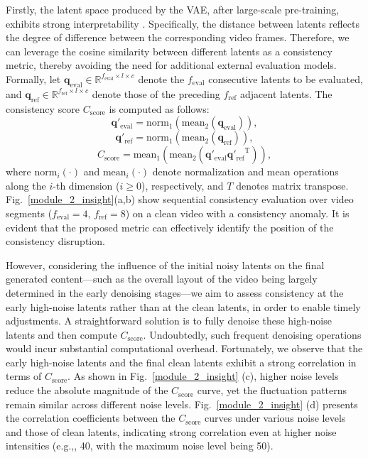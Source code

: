 \documentclass{llmxive}
\providecommand{\eg}{e.g.,\xspace}
\begin{document}
Firstly, the latent space produced by the VAE, after large-scale pre-training, exhibits strong interpretability \cite{kingma2013auto}. Specifically, the distance between latents reflects the degree of difference between the corresponding video frames. Therefore, we can leverage the cosine similarity between different latents as a consistency metric, thereby avoiding the need for additional external evaluation models. 
Formally, let $\mathbf{q}_\mathrm{eval} \in \mathbb{R}^{f_\mathrm{eval} \times l \times c}$ denote the $f_\mathrm{eval}$ consecutive latents to be evaluated, and $\mathbf{q}_\mathrm{ref} \in \mathbb{R}^{f_\mathrm{ref} \times l \times c}$ denote those of the preceding $f_\mathrm{ref}$ adjacent latents. The consistency score $C_\mathrm{score}$ is computed as follows:
\begin{equation}
\mathbf{q}'_\mathrm{eval} = \mathrm{norm}_1\left( \mathrm{mean}_2(\mathbf{q}_\mathrm{eval}) \right),
\label{eq:sim_1}
\end{equation}
\begin{equation}
\mathbf{q}'_\mathrm{ref} = \mathrm{norm}_1\left( \mathrm{mean}_2(\mathbf{q}_\mathrm{ref}) \right),
\label{eq:sim_1_1}
\end{equation}
\begin{equation}
C_\mathrm{score} = \mathrm{mean}_1\left( \mathrm{mean}_2\left( \mathbf{q}'_\mathrm{eval} {\mathbf{q}'_\mathrm{ref}}^\mathrm{T}\right) \right),
\label{eq:sim_2}
\end{equation}
where $\mathrm{norm}_i(\cdot)$ and $\mathrm{mean}_i(\cdot)$ denote normalization and mean operations along the $i$-th dimension ($i \geq 0$), respectively, and $T$ denotes matrix transpose.  
Fig.~\ref{module_2_insight}(a,b) show sequential consistency evaluation over video segments ($f_\mathrm{eval}=4$, $f_\mathrm{ref}=8$) on a clean video with a consistency anomaly. 
It is evident that the proposed metric can effectively identify the position of the consistency disruption.

However, considering the influence of the initial noisy latents \cite{qiu2023freenoise} on the final generated content—such as the overall layout of the video being largely determined in the early denoising stages—we aim to assess consistency at the early high-noise latents rather than at the clean latents, in order to enable timely adjustments. 
A straightforward solution is to fully denoise these high-noise latents and then compute  $C_\mathrm{score}$.
Undoubtedly, such frequent denoising operations would incur substantial computational overhead.
Fortunately, we observe that the early high-noise latents and the final clean latents exhibit a strong correlation in terms of  $C_\mathrm{score}$.
As shown in Fig.~\ref{module_2_insight} (c), higher noise levels reduce the absolute magnitude of the $C_\mathrm{score}$ curve, yet the fluctuation patterns remain similar across different noise levels. Fig.~\ref{module_2_insight} (d) presents the correlation coefficients between the $C_\mathrm{score}$ curves under various noise levels and those of clean latents, indicating strong correlation even at higher noise intensities (\eg, 40, with the maximum noise 
level being 50).
\end{document}
